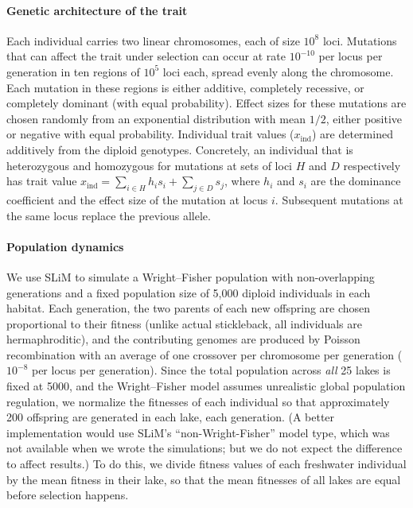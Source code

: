 \documentclass{article}
\begin{document}
\paragraph{Genetic architecture of the trait}

Each individual carries two linear chromosomes, each of size $10^8$ loci. 
Mutations that can affect the trait under selection can occur at rate $10^{-10}$ per locus per generation in ten regions of $10^5$ loci each, spread evenly along the chromosome. 
Each mutation in these regions is either additive, completely recessive, or completely dominant (with equal probability). 
Effect sizes for these mutations are chosen randomly from an exponential distribution with mean $1/2$, either positive or negative with equal probability. 
Individual trait values ($x_\text{ind}$) are determined additively from the diploid genotypes. 
Concretely, an individual that is heterozygous and homozygous for mutations at sets of loci $H$ and $D$ respectively has trait value $x_\text{ind} = \sum_{i \in H} h_i s_i + \sum_{j \in D} s_j$, where $h_i$ and $s_i$ are the dominance coefficient and the effect size of the mutation at locus $i$. Subsequent mutations at the same locus replace the previous allele. 

\paragraph{Population dynamics}

We use SLiM to simulate a Wright--Fisher population with non-overlapping generations and a fixed population size of 5,000 diploid individuals in each habitat. 
Each generation, the two parents of each new offspring are chosen proportional to their fitness 
(unlike actual stickleback, all individuals are hermaphroditic), and the contributing genomes are produced by Poisson recombination with an average of one crossover per chromosome per generation ($10^{-8}$ per locus per generation). 
Since the total population across \emph{all} 25 lakes is fixed at 5000, and the Wright--Fisher model assumes unrealistic global population regulation, we normalize the fitnesses of each individual so that approximately 200 offspring are generated in each lake, each generation. 
(A better implementation would use SLiM's ``non-Wright-Fisher'' model type,
which was not available when we wrote the simulations; but we do not expect the difference to affect results.)
To do this, we divide fitness values of each freshwater individual by the mean fitness in their lake, so that the mean fitnesses of all lakes are equal before selection happens.
\end{document}

